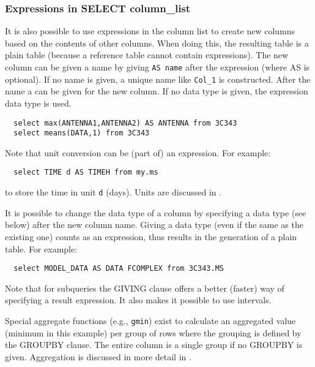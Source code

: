 \subsubsection{Expressions in SELECT column\_list}
It is also possible to use expressions in the column list to create
new columns based on the contents of other columns. When doing this,
the resulting table is a plain table (because a reference table
cannot contain expressions). The new column can be given a name
by giving \texttt{AS name} after the expression (where AS is
optional). If no name is given, a unique name like
\texttt{Col\_1} is constructed.
After the name a  can
be given for the new column. If no data type is given, the expression
data type is used.
\begin{verbatim}
  select max(ANTENNA1,ANTENNA2) AS ANTENNA from 3C343
  select means(DATA,1) from 3C343
\end{verbatim}
Note that unit conversion can be (part of) an expression. For example:
\begin{verbatim}
  select TIME d AS TIMEH from my.ms
\end{verbatim}
to store the time in unit \texttt{d} (days). Units are discussed in
.

It is possible to change the data type of a column by specifying a
data type (see below) after the new column name. Giving a data type
(even if the same as the existing one) counts as an expression,
thus results in the generation of a plain table.
For example:
\begin{verbatim}
  select MODEL_DATA AS DATA FCOMPLEX from 3C343.MS
\end{verbatim}

Note that for subqueries the GIVING clause offers a
better (faster) way of specifying a result expression. It also makes it
possible to use intervals.

Special aggregate functions (e.g., \texttt{gmin}) exist to calculate
an aggregated value (minimum in this example) per group of rows where
the grouping is defined by the GROUPBY clause. The entire column is a
single group if no GROUPBY is given. Aggregation is discussed in more
detail in .

